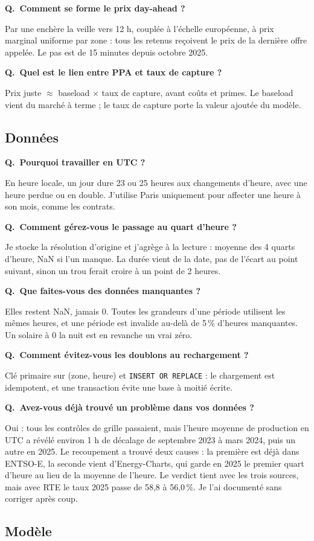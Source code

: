 \documentclass[11pt,a4paper]{article}
\newcommand{\code}[1]{\texttt{\small #1}}
\newcounter{qr}
\newcommand{\qr}[2]{\stepcounter{qr}\par\medskip\noindent\textbf{Q\theqr.\ #1}\par\nopagebreak\noindent #2\par}
\begin{document}
\qr{Comment se forme le prix day-ahead ?}{Par une enchère la veille vers 12 h, couplée à l'échelle européenne, à prix marginal uniforme par zone : tous les retenus reçoivent le prix de la dernière offre appelée. Le pas est de 15 minutes depuis octobre 2025.}

\qr{Quel est le lien entre PPA et taux de capture ?}{Prix juste $\approx$ baseload $\times$ taux de capture, avant coûts et primes. Le baseload vient du marché à terme ; le taux de capture porte la valeur ajoutée du modèle.}

\subsection{Données}

\qr{Pourquoi travailler en UTC ?}{En heure locale, un jour dure 23 ou 25 heures aux changements d'heure, avec une heure perdue ou en double. J'utilise Paris uniquement pour affecter une heure à son mois, comme les contrats.}

\qr{Comment gérez-vous le passage au quart d'heure ?}{Je stocke la résolution d'origine et j'agrège à la lecture : moyenne des 4 quarts d'heure, NaN si l'un manque. La durée vient de la date, pas de l'écart au point suivant, sinon un trou ferait croire à un point de 2 heures.}

\qr{Que faites-vous des données manquantes ?}{Elles restent NaN, jamais 0. Toutes les grandeurs d'une période utilisent les mêmes heures, et une période est invalide au-delà de 5\,\% d'heures manquantes. Un solaire à 0 la nuit est en revanche un vrai zéro.}

\qr{Comment évitez-vous les doublons au rechargement ?}{Clé primaire sur (zone, heure) et \code{INSERT OR REPLACE} : le chargement est idempotent, et une transaction évite une base à moitié écrite.}

\qr{Avez-vous déjà trouvé un problème dans vos données ?}{Oui : tous les contrôles de grille passaient, mais l'heure moyenne de production en UTC a révélé environ 1 h de décalage de septembre 2023 à mars 2024, puis un autre en 2025. Le recoupement a trouvé deux causes : la première est déjà dans ENTSO-E, la seconde vient d'Energy-Charts, qui garde en 2025 le premier quart d'heure au lieu de la moyenne de l'heure. Le verdict tient avec les trois sources, mais avec RTE le taux 2025 passe de 58,8 à 56,0\,\%. Je l'ai documenté sans corriger après coup.}

\subsection{Modèle}
\end{document}
